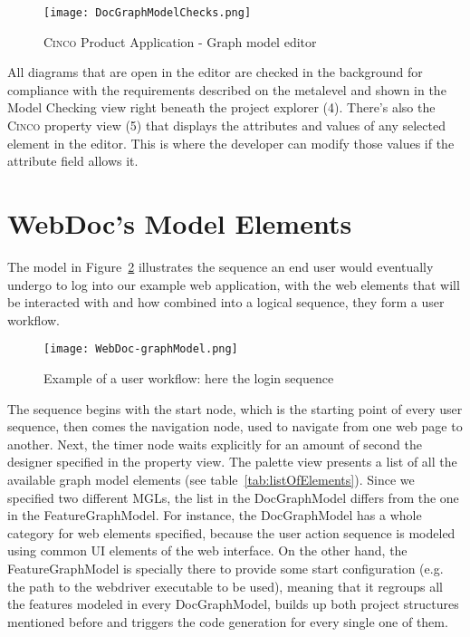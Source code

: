 \begin{figure}[h]
    \centering
    \texttt{[image: DocGraphModelChecks.png]}
    \caption{\textsc{Cinco} Product Application - Graph model editor}\label{fig:graphDSL}
\end{figure}

All diagrams that are open in the editor are checked in the background for compliance with the requirements described on the metalevel and shown in the Model Checking view right beneath the project explorer (4). There's also the \textsc{Cinco} property view (5) that displays the attributes and values of any selected element in the editor. This is where the developer can modify those values if the attribute field allows it.

\section{WebDoc's Model Elements}\label{sec:modelElements}

The model in Figure~\ref{fig:loginSeq} illustrates the sequence an end user would eventually undergo to log into our example web application, with the web elements that will be interacted with and how combined into a logical sequence, they form a user workflow. 

\begin{figure}[h]
    \centering
    \texttt{[image: WebDoc-graphModel.png]}
    \caption{Example of a user workflow: here the login sequence}
    \label{fig:loginSeq}
\end{figure}

The sequence begins with the start node, which is the starting point of every user sequence, then comes the navigation node, used to navigate from one web page to another. Next, the timer node waits explicitly for an amount of second the designer specified in the property view. The palette view presents a list of all the available graph model elements (see table~\ref{tab:listOfElements}). Since we specified two different MGLs, the list in the DocGraphModel differs from the one in the FeatureGraphModel. For instance, the DocGraphModel has a whole category for web elements specified, because the user action sequence is modeled using common UI elements of the web interface. On the other hand, the FeatureGraphModel is specially there to provide some start configuration (e.g. the path to the webdriver executable to be used), meaning that it regroups all the features modeled in every DocGraphModel, builds up both project structures mentioned before and triggers the code generation for every single one of them.

